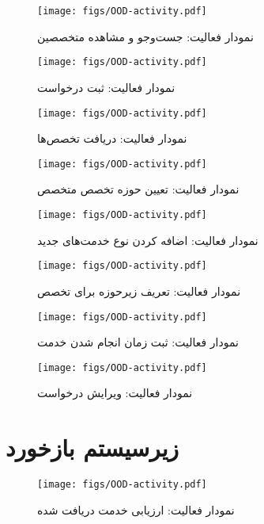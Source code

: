 \begin{figure}
	\centering
	\texttt{[image: figs/OOD-activity.pdf]}
	\caption{نمودار فعالیت: جست‌وجو و مشاهده متخصصین}
\end{figure}
\FloatBarrier
\newpage

\begin{figure}
	\centering
	\texttt{[image: figs/OOD-activity.pdf]}
	\caption{نمودار فعالیت: ثبت درخواست}
\end{figure}
\FloatBarrier
\newpage

\begin{figure}
	\centering
	\texttt{[image: figs/OOD-activity.pdf]}
	\caption{نمودار فعالیت: دریافت تخصص‌ها}
\end{figure}
\FloatBarrier
\newpage

\begin{figure}
	\centering
	\texttt{[image: figs/OOD-activity.pdf]}
	\caption{نمودار فعالیت: تعیین حوزه تخصص متخصص}
\end{figure}
\FloatBarrier
\newpage

\begin{figure}
	\centering
	\texttt{[image: figs/OOD-activity.pdf]}
	\caption{نمودار فعالیت: اضافه کردن نوع خدمت‌های جدید}
\end{figure}
\FloatBarrier
\newpage

\begin{figure}
	\centering
	\texttt{[image: figs/OOD-activity.pdf]}
	\caption{نمودار فعالیت: تعریف زیرحوزه برای تخصص}
\end{figure}
\FloatBarrier
\newpage

\begin{figure}
	\centering
	\texttt{[image: figs/OOD-activity.pdf]}
	\caption{نمودار فعالیت: ثبت زمان انجام شدن خدمت}
\end{figure}
\FloatBarrier
\newpage

\begin{figure}
	\centering
	\texttt{[image: figs/OOD-activity.pdf]}
	\caption{نمودار فعالیت: ویرایش درخواست}
\end{figure}
\FloatBarrier
\newpage


\section{زیرسیستم بازخورد}


\begin{figure}
	\centering
	\texttt{[image: figs/OOD-activity.pdf]}
	\caption{نمودار فعالیت: ارزیابی خدمت دریافت شده}
\end{figure}
\FloatBarrier
\newpage

